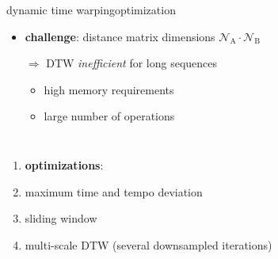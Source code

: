         \begin{frame}{dynamic time warping}{optimization}
            \vspace{-3mm}
            \begin{itemize}
                \item \textbf{challenge}:  distance matrix dimensions  $\mathcal{N}_\mathrm{A}\cdot \mathcal{N}_\mathrm{B}$
                \smallskip
                \item[$\Rightarrow$] DTW \textit{inefficient} for long sequences 
                    \begin{itemize}
                        \item	high memory requirements
                        \item	large number of operations
                    \end{itemize}
            \end{itemize}
            \vspace{-2mm}
            \begin{columns}
                 
                    \begin{enumerate}
                        \item<2->[] \textbf{optimizations}: 
                        \item<2->	maximum time and tempo deviation
                        \item<3->	sliding window 
                        \item<4->	multi-scale DTW (several downsampled iterations)
                    \end{enumerate}
            \end{columns}
            \vspace{-2mm}

        \end{frame}


